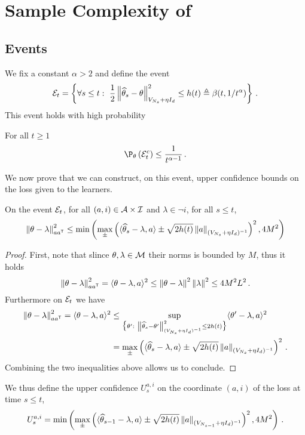 \section{Sample Complexity of \LG{}}\label{app:lgc.proof}

\subsection{Events}\label{app:lgc.proof_nc.events}
We fix a constant $\alpha>2$ and define the event
\[
\mathcal{E}_t = \left\{\forall s \leq  t:\ \frac{1}{2}\left\lVert\widehat{\theta}_s-\theta\right\rVert^2_{V_{N_s}+\eta I_d} \leq h(t)\triangleq \beta(t,1/t^\alpha)\right\}\,.
\]
This event holds with high probability
\begin{lemma}
\label{lem:prb_Et_nc}
For all $t \geq 1$
\[
\P_\theta\left(\cE_t^c\right)\leq \frac{1}{t^{\alpha-1}}\,.
\]
\end{lemma}
We now prove that we can construct, on this event, upper confidence bounds on the loss given to the learners.
\begin{lemma}
\label{lem:confidence_bound_general_nc}
On the event $\mathcal{E}_t$, for all $(a,i)\in\mathcal{A}\times\mathcal{I}$ and $\lambda\in\neg i$, for all $s\leq t$,
\[
\left\lVert\theta-\lambda\right\rVert^2_{aa^{\mathsf{\scriptscriptstyle T}}} \leq \min\left(\max_\pm \left( \langle \widehat{\theta}_{s} - \lambda,a\rangle \pm \sqrt{2 h(t)} \left\lVert a\right\rVert_{(V_{N_s}+ \eta I_d)^{-1}} \right)^2,4M^2\right)
\]
\end{lemma}
\begin{proof}
First, note that slince $\theta,\lambda\in\mathcal{M}$ their norms is bounded by $M$, thus it holds
\[
\left\lVert\theta-\lambda\right\rVert^2_{aa^{\mathsf{\scriptscriptstyle T}}} = \langle\theta-\lambda,a \rangle^2 \leq \left\lVert\theta-\lambda\right\rVert^2 \left\lVert\lambda\right\rVert^2 \leq 4M^2L^2\,.
\]
Furthermore on $\mathcal{E}_t$ we have
\begin{align*}
\left\lVert\theta-\lambda\right\rVert^2_{aa^{\mathsf{\scriptscriptstyle T}}} = \langle\theta-\lambda,a \rangle^2 &\leq \sup_{\big\{\theta':\ \left\lVert\widehat{\theta}_s-\theta'\right\rVert^2_{(V_{N_s} + \eta I_d)^{-1} } \leq 2h(t)\big\}} \langle\theta'-\lambda,a \rangle^2\\
&=\max_\pm \left( \langle \widehat{\theta}_{s} - \lambda,a\rangle \pm \sqrt{2 h(t)} \left\lVert a\right\rVert_{(V_{N_s}+ \eta I_d)^{-1}} \right)^2\,.
\end{align*}
Combining the two inequalities above allows us to conclude.
\end{proof}
We thus define the upper confidence $U_s^{a,i}$ on the coordinate $(a,i)$ of the loss at time $s\leq t$,
\begin{equation}
\label{eq:def_ucb_br_general_nc}
U_s^{a,i} = \min\left(\max_\pm \left( \langle \widehat{\theta}_{s-1} - \lambda,a\rangle \pm \sqrt{2 h(t)} \left\lVert a\right\rVert_{(V_{N_{s-1}}+ \eta I_d)^{-1}} \right)^2,4M^2\right)\,.
\end{equation}
